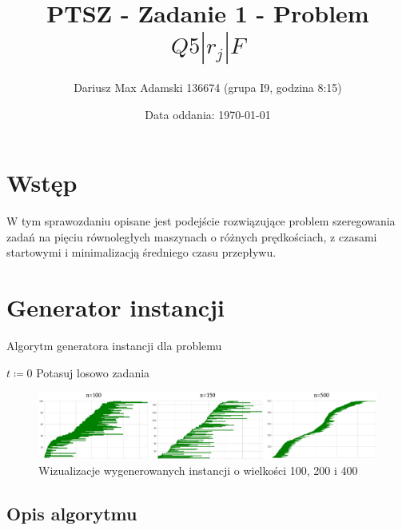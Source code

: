 \documentclass[11pt]{article}
\title{PTSZ - Zadanie 1 - Problem $Q5 | r_j | F$}
\author{Dariusz Max Adamski 136674 (grupa I9, godzina 8:15)}
\affil{dariusz.adamski@student.put.poznan.pl}
\date{Data oddania: \today}
\begin{document}
\maketitle

\section*{Wstęp}

W tym sprawozdaniu opisane jest podejście rozwiązujące problem szeregowania zadań na pięciu równoległych maszynach o różnych prędkościach, z czasami startowymi i minimalizacją średniego czasu przepływu.

\section{Generator instancji}

\begin{algorithm}
\caption{Algorytm generatora instancji dla problemu}
$t \coloneqq 0$ \;
Potasuj losowo zadania
\end{algorithm}

\begin{figure}[h]
\caption{Wizualizacje wygenerowanych instancji o wielkości 100, 200 i 400}
\includegraphics[width=\textwidth]{inst.png}
\centering
\end{figure}

\subsection{Opis algorytmu}
\end{document}
